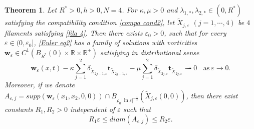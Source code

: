 \documentclass[12pt,reqno]{amsart}
\numberwithin{equation}{section}
\newtheorem{theorem}{Theorem}[section]
\theoremstyle{definition}
\theoremstyle{remark}
\begin{document}
\begin{theorem}\label{thm04}
	Let $ R^*>0, h>0, N=4 $. For $ \kappa,\mu>0 $ and $ \lambda_{1,*},\lambda_{2,*}\in (0,R^*) $ satisfying the compatibility condition \eqref{compa cond2},
let $ \tilde{X}_{j,\varepsilon} $ $(j=1,\cdots,4)$ be $ 4 $ filaments satisfying \eqref{fila 4}. Then  there exists $ \varepsilon_0>0 $, such that for every $ \varepsilon\in(0,\varepsilon_0] $, \eqref{Euler eq2} has a family of solutions with vorticities $ \mathbf{w}_\varepsilon\in C^1(B_{R^*}(0)\times \mathbb{R}\times\mathbb{R}^+) $ satisfying in distributional sense
	\begin{equation*} 
	\mathbf{w}_\varepsilon(x,t)-  \kappa\sum_{j=1}^2\delta_{\tilde{X}_{2j-1,\varepsilon}}\textbf{t}_{\tilde{X}_{2j-1,\varepsilon}}-\mu\sum_{j=1}^2\delta_{\tilde{X}_{2j,\varepsilon}}\textbf{t}_{\tilde{X}_{2j,\varepsilon}}\rightharpoonup0\ \ \ \ \text{as}\ \varepsilon\to0.
	\end{equation*}
	Moreover, if we denote   $ A_{\varepsilon,j}=supp\left (\mathbf{w}_\varepsilon(x_1,x_2,0,0)\right ) \cap B_{\rho_0|\ln\varepsilon|^{-\frac{1}{2}}}\left ( \tilde{X}_{j,\varepsilon}(0,0)\right )  $, then there exist constants $ R_1,R_2>0 $ independent of $ \varepsilon $  such that
	\begin{equation*}
	R_1\varepsilon \leq diam(A_{\varepsilon,j})\leq R_2\varepsilon .
	\end{equation*}
\end{theorem}
\end{document}
